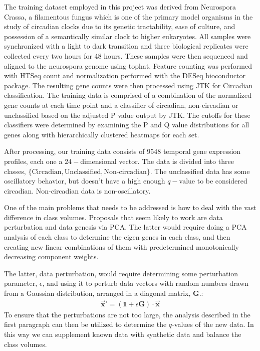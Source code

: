 \documentclass[prl,amsmath,amssymb,floatfix,superscriptaddress,notitlepage,twocolumn]{revtex4}
\newcommand{\ee}[1]{\begin{align} #1 \end{align}} 						%
\newcommand{\vc}[1]{\vec{\mathbf{#1}}} 								%
\begin{document}
The training dataset employed in this project was derived from Neurospora Crassa, a filamentous fungus which is one of the primary model organisms in the study of circadian clocks due to its genetic tractability, ease of culture, and possession of a semantically similar clock to higher eukaryotes.  All samples were synchronized with a light to dark transition and three biological replicates were collected every two hours for 48 hours.  These samples were then sequenced and aligned to the neurospora genome using tophat.  Feature counting was performed with HTSeq count and normalization performed with the DESeq bioconductor package.  The resulting gene counts were then processed using JTK for Circadian classification.  The training data is comprised of a combination of the normalized gene counts at each time point and a classifier of circadian, non-circadian or unclassified based on the adjusted P value output by JTK. The cutoffs for these classifiers were determined by examining the P and Q value distributions for all genes along with hierarchically clustered heatmaps for each set.

After processing, our training data consists of 9548 temporal gene expression profiles, each one a $24-$dimensional vector. The data is divided into three classes, $\{\text{Circadian},\text{Unclassified},\text{Non-circadian}\}$. The unclassified data has some oscillatory behavior, but doesn't have a high enough $q-$value to be considered circadian. Non-circadian data is non-oscillatory. 

One of the main problems that needs to be addressed is how to deal with the vast difference in class volumes. Proposals that seem likely to work are data perturbation and data genesis via PCA. The latter would require doing a PCA analysis of each class to determine the eigen genes in each class, and then creating new linear combinations of them with predetermined monotonically decreasing component weights. 

The latter, data perturbation, would require determining some perturbation parameter, $\epsilon$, and using it to perturb data vectors with random numbers drawn from a Gaussian distribution, arranged in a diagonal matrix, $\textbf{G}$.:
\ee{
\vc{x}' =(\mathbb{1}+\epsilon\textbf{G} )\cdot\vc{x}
} 
To ensure that the perturbations are not too large, the analysis described in the first paragraph can then be utilized to determine the $q$-values of the new data. In this way we can supplement known data with synthetic data and balance the class volumes. 
\end{document}
